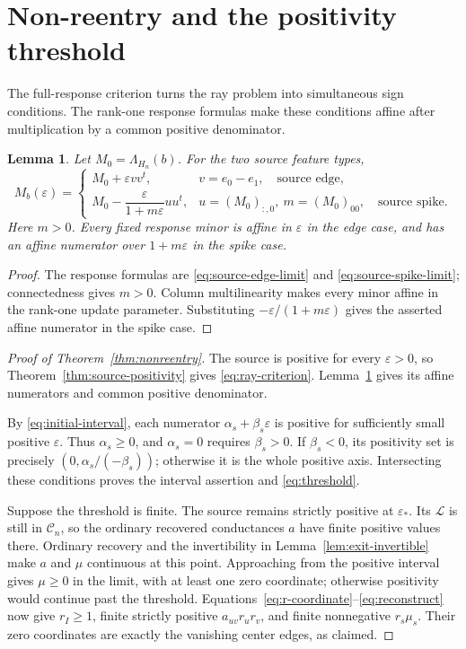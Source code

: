 \documentclass[11pt]{article}
\newtheorem{lemma}[theorem]{Lemma}
\theoremstyle{definition}
\newcommand{\cell}{\mathcal C}
\begin{document}
\section{Non-reentry and the positivity threshold}
\label{sec:ray}

The full-response criterion turns the ray problem into simultaneous
sign conditions. The rank-one response formulas make these conditions
affine after multiplication by a common positive denominator.

\begin{lemma}
\label{lem:rank-one}
Let $M_0=\Lambda_{H_n}(b)$. For the two source feature types,
\begin{equation}
 M_b(\varepsilon)=
 \begin{cases}
 M_0+\varepsilon vv^t,&v=e_0-e_1,\quad\text{source edge},\\[2pt]
 M_0-\dfrac{\varepsilon}{1+m\varepsilon}uu^t,
       &u=(M_0)_{:,0},\ m=(M_0)_{00},\quad\text{source spike}.
 \end{cases}
 \label{eq:rank-one}
\end{equation}
Here $m>0$. Every fixed response minor is affine in
$\varepsilon$ in the edge case, and has an affine numerator
over $1+m\varepsilon$ in the spike case.
\end{lemma}
\begin{proof}
The response formulas are \eqref{eq:source-edge-limit} and
\eqref{eq:source-spike-limit}; connectedness gives $m>0$.
Column multilinearity makes every minor affine in the rank-one
update parameter. Substituting $-\varepsilon/(1+m\varepsilon)$
gives the asserted affine numerator in the spike case.
\end{proof}

\begin{proof}[Proof of Theorem~\ref{thm:nonreentry}]
The source is positive for every $\varepsilon>0$, so
Theorem~\ref{thm:source-positivity} gives \eqref{eq:ray-criterion}.
Lemma~\ref{lem:rank-one} gives its affine numerators and common
positive denominator.

By \eqref{eq:initial-interval}, each numerator
$\alpha_s+\beta_s\varepsilon$ is positive for sufficiently
small positive $\varepsilon$. Thus $\alpha_s\ge0$, and
$\alpha_s=0$ requires $\beta_s>0$. If $\beta_s<0$, its
positivity set is precisely
$(0,\alpha_s/(-\beta_s))$; otherwise it is the whole positive
axis. Intersecting these conditions proves the interval assertion
and \eqref{eq:threshold}.

Suppose the threshold is finite. The source remains strictly
positive at $\varepsilon_*$. Its $\mathcal L$ is still in
$\cell_n$, so the ordinary recovered conductances $a$ have
finite positive values there. Ordinary recovery and the
invertibility in Lemma~\ref{lem:exit-invertible} make $a$ and
$\mu$ continuous at this point. Approaching from the positive
interval gives $\mu\ge0$ in the limit, with at least one zero
coordinate; otherwise positivity would continue past the threshold.
Equations~\eqref{eq:r-coordinate}--\eqref{eq:reconstruct} now give
$r_I\ge1$, finite strictly positive $a_{uv}r_ur_v$, and finite
nonnegative $r_s\mu_s$. Their zero coordinates are exactly the
vanishing center edges, as claimed.
\end{proof}
\end{document}
